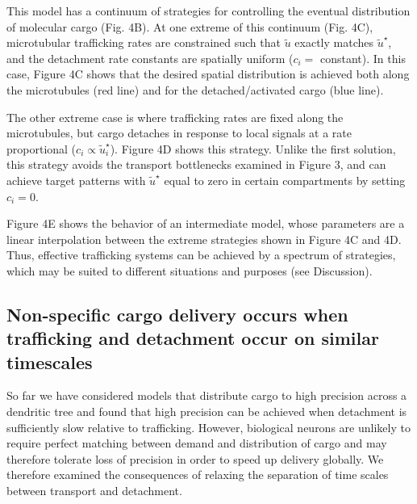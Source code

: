 \documentclass[11pt]{wlpeerj}
\begin{document}
This model has a continuum of strategies for controlling the eventual distribution of molecular cargo (Fig. 4B).
At one extreme of this continuum (Fig. 4C), microtubular trafficking rates are constrained such that $\tilde{u}$ exactly matches $\tilde{u}^\star$, and the detachment rate constants are spatially uniform ($c_i =$ constant).
In this case, Figure 4C shows that the desired spatial distribution is achieved both along the microtubules (red line) and for the detached/activated cargo (blue line).


The other extreme case is where trafficking rates are fixed along the microtubules, but cargo detaches in response to local signals at a rate proportional ($c_i \propto \tilde{u}^\star_i$). Figure 4D shows this strategy. Unlike the first solution, this strategy avoids the transport bottlenecks examined in Figure 3, and can achieve target patterns with  $\tilde{u}^\star$ equal to zero in certain compartments by setting $c_i = 0$. 

Figure 4E shows the behavior of an intermediate model, whose parameters are a linear interpolation between the extreme strategies shown in Figure 4C and 4D.
Thus, effective trafficking systems can be achieved by a spectrum of strategies, which may be suited to different situations and purposes (see Discussion). 

\subsection*{Non-specific cargo delivery occurs when trafficking and detachment occur on similar timescales}

So far we have considered models that distribute cargo to high precision across a dendritic tree and found that high precision can be achieved when detachment is sufficiently slow relative to trafficking. However, biological neurons are unlikely to require perfect matching between demand and distribution of cargo and may therefore tolerate loss of precision in order to speed up delivery globally.
We therefore examined the consequences of relaxing the separation of time scales between transport and detachment.
\end{document}
